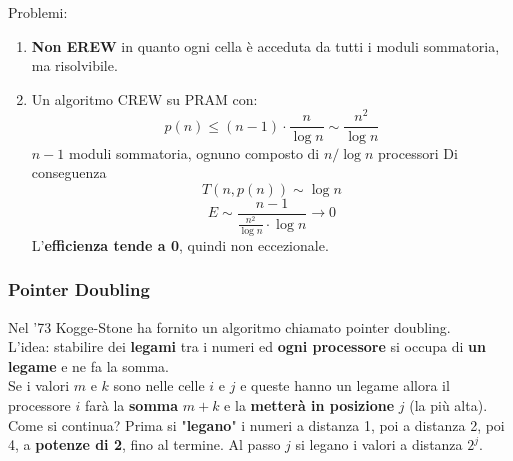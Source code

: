 \documentclass[11pt]{article}
\begin{document}
	Problemi: 
	\begin{enumerate}
		\item \textbf{Non EREW} in quanto ogni cella è acceduta da tutti i moduli sommatoria, ma risolvibile.\\
		
		\item Un algoritmo CREW su PRAM con: 
		$$ p(n) \leq (n-1) \cdot \frac{n}{\log n} \sim \frac{n^2}{\log n} $$
		$n-1$ moduli sommatoria, ognuno composto di $n/\log n$ processori Di conseguenza
		$$ T(n, p(n)) \sim \log n $$
		$$ E \sim \frac{n-1}{\frac{n^2}{\log n} \cdot \log n} \rightarrow 0$$
		L'\textbf{efficienza tende a 0}, quindi non eccezionale.\\
	\end{enumerate}
	
	
	\newpage
	
	\subsubsection{Pointer Doubling}
	Nel '73 Kogge-Stone ha fornito un algoritmo chiamato pointer doubling.\\
	
	L'idea: stabilire dei \textbf{legami} tra i numeri ed \textbf{ogni processore} si occupa di \textbf{un legame} e ne fa la somma.  \\
	Se i valori $m$ e $k$ sono nelle celle $i$ e $j$ e queste hanno un legame allora il processore $i$ farà la \textbf{somma} $m+k$ e la \textbf{metterà in posizione} $j$ (la più alta).\\
	
	Come si continua? Prima si "\textbf{legano}" i numeri a distanza 1, poi a distanza 2, poi 4, a \textbf{potenze di 2}, fino al termine. Al passo $j$ si legano i valori a distanza $2^j$.\\
	
\end{document}
